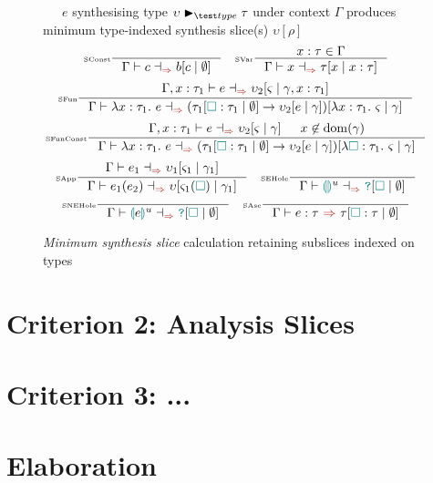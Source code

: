 \begin{figure}[H]
\small
{}\ \ \ $e$ synthesising type $\upsilon \typematch \tau$ under context $\Gamma$ produces minimum type-indexed synthesis slice(s) $\upsilon[\rho]$
\tiny
\[\inference[\tiny SConst]{}{\synthesissliceindexed{c}{b[c\mid \emptyset]}} \quad
\inference[\tiny SVar]{x : \tau \in \Gamma}{\synthesissliceindexed{x}{\tau[x\mid x:\tau]}}\]
\[\inference[\tiny SFun]{\synthesissliceindexed[\Gamma,x:\tau_1]{e}{\upsilon_2[\varsigma \mid \gamma, x : \tau_1]}}{\synthesissliceindexed{\lambda x:\tau_1.\ e}{(\tau_1[\gap : \tau_1 \mid \emptyset] \to \upsilon_2[e \mid \gamma])[\lambda x : \tau_1.\ \varsigma \mid \gamma]}}\]
\[\inference[\tiny SFunConst]{\synthesissliceindexed[\Gamma,x:\tau_1]{e}{\upsilon_2[\varsigma \mid \gamma]} & x \not \in \mathrm{dom}(\gamma)}{\synthesissliceindexed{\lambda x:\tau_1.\ e}{(\tau_1[\gap : \tau_1 \mid \emptyset] \to \upsilon_2[e \mid \gamma])[\lambda \gap : \tau_1.\ \varsigma \mid \gamma]}}\]
\[\inference[\tiny SApp]{\synthesissliceindexed{e_1}{\upsilon_1[\varsigma_1 \mid \gamma_1]}}{\synthesissliceindexed{e_1(e_2)}{\upsilon[\varsigma_1(\gap) \mid \gamma_1]}} \quad 
\inference[\tiny SEHole]{}{\synthesissliceindexed{\hole^u}{\dyn[\gap \mid \emptyset]}}\]
\[\inference[\tiny SNEHole]{}{\synthesissliceindexed{\hole[e]^u}{\dyn[\gap \mid \emptyset]}}\quad 
\inference[\tiny SAsc]{}{\synthesis{e : \tau}{\tau[\gap : \tau \mid \emptyset]}}\]
\caption{\textit{Minimum synthesis slice} calculation retaining subslices indexed on types}
\label{fig:SynthesisSlicesIndexed}
\end{figure} 

\section{Criterion 2: Analysis Slices}


\section{Criterion 3: ...}


\section{Elaboration}


